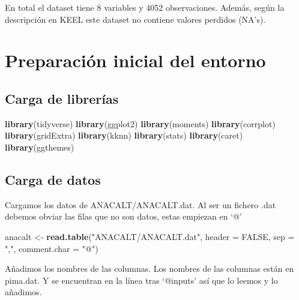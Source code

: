 \documentclass[
]{article}
\newenvironment{Shaded}{\begin{snugshade}}{\end{snugshade}}
\newcommand{\AttributeTok}[1]{\textcolor[rgb]{0.13,0.29,0.53}{#1}}
\newcommand{\ConstantTok}[1]{\textcolor[rgb]{0.56,0.35,0.01}{#1}}
\newcommand{\FunctionTok}[1]{\textcolor[rgb]{0.13,0.29,0.53}{\textbf{#1}}}
\newcommand{\NormalTok}[1]{#1}
\newcommand{\OtherTok}[1]{\textcolor[rgb]{0.56,0.35,0.01}{#1}}
\newcommand{\StringTok}[1]{\textcolor[rgb]{0.31,0.60,0.02}{#1}}
\begin{document}
En total el dataset tiene 8 variables y 4052 observaciones. Además,
según la descripción en KEEL este dataset no contiene valores perdidos
(NA's).

\hypertarget{preparaciuxf3n-inicial-del-entorno}{%
\section{Preparación inicial del
entorno}\label{preparaciuxf3n-inicial-del-entorno}}

\hypertarget{carga-de-libreruxedas}{%
\subsection{Carga de librerías}\label{carga-de-libreruxedas}}

\begin{Shaded}
\begin{Highlighting}[]
\FunctionTok{library}\NormalTok{(tidyverse)}
\FunctionTok{library}\NormalTok{(ggplot2)}
\FunctionTok{library}\NormalTok{(moments)}
\FunctionTok{library}\NormalTok{(corrplot)}
\FunctionTok{library}\NormalTok{(gridExtra)}
\FunctionTok{library}\NormalTok{(kknn)}
\FunctionTok{library}\NormalTok{(stats)}
\FunctionTok{library}\NormalTok{(caret)}
\FunctionTok{library}\NormalTok{(ggthemes)}
\end{Highlighting}
\end{Shaded}

\hypertarget{carga-de-datos}{%
\subsection{Carga de datos}\label{carga-de-datos}}

Cargamos los datos de ANACALT/ANACALT.dat. Al ser un fichero .dat
debemos obviar las filas que no son datos, estas empiezan en `@'

\begin{Shaded}
\begin{Highlighting}[]
\NormalTok{anacalt }\OtherTok{\textless{}{-}} \FunctionTok{read.table}\NormalTok{(}\StringTok{"ANACALT/ANACALT.dat"}\NormalTok{, }\AttributeTok{header =} \ConstantTok{FALSE}\NormalTok{,}
                   \AttributeTok{sep =} \StringTok{","}\NormalTok{, }\AttributeTok{comment.char =} \StringTok{"@"}\NormalTok{)}
\end{Highlighting}
\end{Shaded}

Añadimos los nombres de las columnas. Los nombres de las columnas están
en pima.dat. Y se encuentran en la línea tras `@inputs' así que lo
leemos y lo añadimos.
\end{document}
